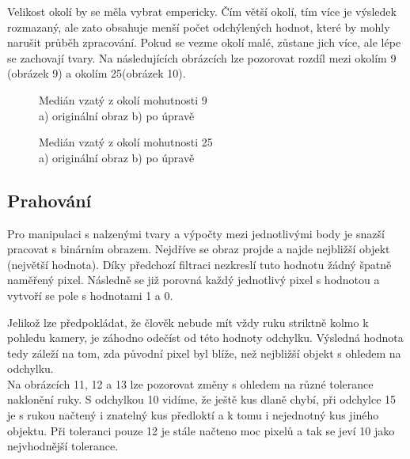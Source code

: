 Velikost okolí by se měla vybrat empericky. Čím větší okolí, tím více je výsledek rozmazaný, ale zato obsahuje menší počet odchýlených hodnot, které by mohly narušit průběh zpracování. Pokud se vezme okolí malé, zůstane jich více, ale lépe se zachovají tvary. Na následujících obrázcích lze pozorovat rozdíl mezi okolím 9 (obrázek 9) a okolím 25(obrázek 10).\\

\begin{figure}[htp]
\centering
{} \hfil
{}
\caption{Medián vzatý z okolí mohutnosti 9 \\ a) originální obraz b) po úpravě}
\label{fig:neigh9}
\end{figure}
\begin{figure}[htp]
\centering
{} \hfil
{}
\caption{Medián vzatý z okolí mohutnosti 25 \\ a) originální obraz b) po úpravě}
\label{fig:neigh25}
\end{figure}

\subsection{Prahování}
Pro manipulaci s nalzenými tvary a výpočty mezi jednotlivými body je snazší pracovat s binárním obrazem. Nejdříve se obraz projde a najde nejbližší objekt (největší hodnota). Díky předchozí filtraci nezkreslí tuto hodnotu žádný špatně naměřený pixel. Následně se již porovná každý jednotlivý pixel s hodnotou a vytvoří se pole s hodnotami 1 a 0.

Jelikož lze předpokládat, že člověk nebude mít vždy ruku striktně kolmo k pohledu kamery, je záhodno odečíst od této hodnoty odchylku. Výsledná hodnota tedy záleží na tom, zda původní pixel byl blíže, než nejbližší objekt s ohledem na odchylku.\\
Na obrázcích 11, 12 a 13 lze pozorovat změny s ohledem na různé tolerance naklonění ruky. S odchylkou 10 vidíme, že ještě kus dlaně chybí, při odchylce 15 je s rukou načtený i znatelný kus předloktí a k tomu i nejednotný kus jiného objektu. Při toleranci pouze 12 je stále načteno moc pixelů a tak se jeví 10 jako nejvhodnější tolerance.\\

